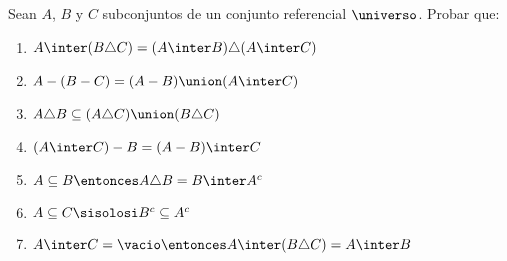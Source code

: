 \begin{enunciado}{\ejercicio}

  Sean $A$, $B$ y $C$ subconjuntos de un conjunto referencial $\universo$. Probar que:
  \begin{multicols}{2}
    \begin{enumerate}[label=\roman*)]
      \item $A \inter (B \triangle C) = (A \inter B) \triangle (A \inter C)$
      \item $A - (B - C) = (A-B) \union (A \inter C)$
      \item $A \triangle B \subseteq (A \triangle C) \union (B \triangle C)$
      \item $(A \inter C ) - B = (A - B) \inter C$
      \item $A \subseteq B \entonces A \triangle B = B \inter A^c$
      \item $A \subseteq C \sisolosi B^c \subseteq A^c$
      \item $A \inter C = \vacio \entonces A \inter (B \triangle C) = A \inter B$
    \end{enumerate}
  \end{multicols}

\end{enunciado}

